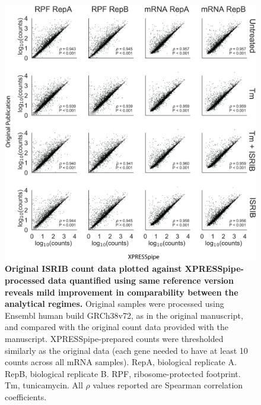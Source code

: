 \documentclass[10pt, oneside]{article}
\begin{document}
\begin{figure}
\centering
  \includegraphics[width=180mm]{figures/xpresspipe_supplement5.png}
  \caption{\textbf{Original ISRIB count data plotted against XPRESSpipe-processed data quantified using same reference version reveals mild improvement in comparability between the analytical regimes.} Original samples were processed using Ensembl human build GRCh38v72, as in the original manuscript, and compared with the original count data provided with the manuscript. XPRESSpipe-prepared counts were thresholded similarly as the original data (each gene needed to have at least 10 counts across all mRNA samples). RepA, biological replicate A. RepB, biological replicate B. RPF, ribosome-protected footprint. Tm, tunicamycin. All $\rho$ values reported are Spearman correlation coefficients.}
  \label{fig:supplement5}
\end{figure}
\end{document}
